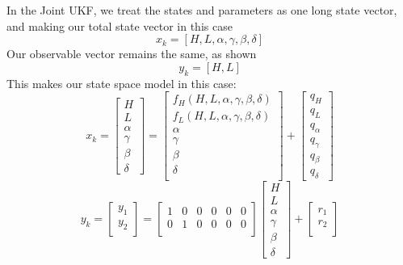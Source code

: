 \documentclass{article}
\begin{document}
In the Joint UKF, we treat the states and parameters as one long state vector, and making our total state vector in this case
\begin{equation}
x_k = [H, L, \alpha, \gamma, \beta, \delta]
\end{equation}
Our observable vector remains the same, as shown
\begin{equation}
y_k = [H, L]
\end{equation}
This makes our state space model in this case:
\begin{equation}
x_k = \begin{bmatrix}
H\\
L\\
\alpha\\
\gamma\\
\beta\\
\delta
\end{bmatrix} = \begin{bmatrix}
f_H(H,L,\alpha, \gamma, \beta, \delta)\\
f_L(H,L,\alpha, \gamma, \beta, \delta)\\
\alpha\\
\gamma\\
\beta\\
\delta\\
\end{bmatrix} + \begin{bmatrix}
q_H\\
q_L\\
q_{\alpha}\\
q_{\gamma}\\
q_{\beta}\\
q_{\delta}
\end{bmatrix}
\end{equation}
\begin{equation}
y_k = \begin{bmatrix}
y_1\\
y_2\\
\end{bmatrix} = 
\begin{bmatrix}
1 & 0 & 0 & 0 & 0 & 0\\
0 & 1 & 0 & 0 & 0 & 0\\
\end{bmatrix}
\begin{bmatrix}
H\\
L\\
\alpha\\
\gamma\\
\beta\\
\delta
\end{bmatrix}+
\begin{bmatrix}
r_1\\
r_2\\
\end{bmatrix}
\end{equation}
\end{document}
